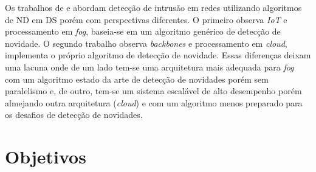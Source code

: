 

Os trabalhos de  e  abordam
detecção de intrusão em redes utilizando algoritmos de ND em DS porém com
perspectivas diferentes.
O primeiro observa \emph{IoT} e processamento em \emph{fog}, baseia-se em um
algoritmo genérico de detecção de novidade.
O segundo trabalho observa \emph{backbones} e processamento em \emph{cloud},
implementa o próprio algoritmo de detecção de novidade.
Essas diferenças deixam uma lacuna onde de um lado tem-se uma
arquitetura mais adequada para \emph{fog} com um algoritmo estado da arte de
detecção de novidades porém sem paralelismo e, de outro, tem-se um sistema
escalável de alto desempenho porém almejando outra arquitetura (\emph{cloud}) e
com um algoritmo menos preparado para os desafios de detecção de novidades.


\section{Objetivos}\label{sec:objetivos}

